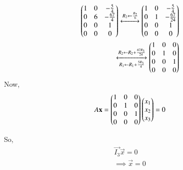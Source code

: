 \begin{align}
\begin{pmatrix}1 & 0 & -\frac{5}{4}\\0 & 6 & -\frac{67}{4}\\0 & 0 & 1\\0 & 0 & 0\end{pmatrix}\xleftrightarrow[]{R_2\leftarrow \frac{R_2}{6}}
\begin{pmatrix}1 & 0 & -\frac{5}{4}\\0 & 1 & -\frac{67}{24}\\0 & 0 & 1\\0 & 0 & 0\end{pmatrix}\\
\xleftrightarrow[R_1\leftarrow R_1+\frac{5R_3}{4}]{R_2\leftarrow R_2+\frac{67R_3}{24}}
\begin{pmatrix}1 & 0 & 0\\0 & 1 & 0\\0 & 0 & 1\\0 & 0 & 0\end{pmatrix}
\end{align}
Now,
\begin{align}
A\mathbf{x} = \begin{pmatrix}1 & 0 & 0\\0 & 1 & 0\\0 & 0 & 1\\0 & 0 & 0\end{pmatrix}\begin{pmatrix}x_1\\x_2\\x_3\end{pmatrix} = 0
\end{align}


So,
\begin{align}
\vec{I_3} \vec{x} = 0\\
\implies \vec{x} = 0
\end{align}
